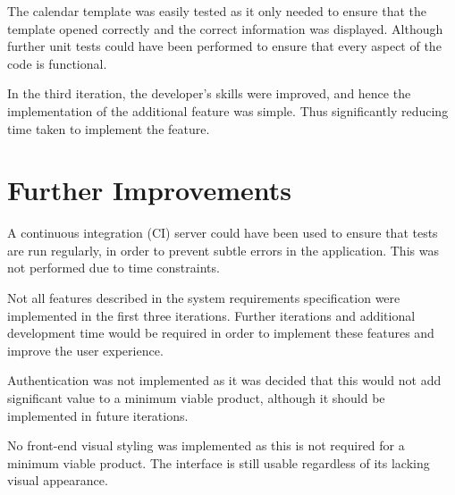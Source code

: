 \documentclass[11pt, a4paper]{article}
\begin{document}
	The calendar template was easily tested as it only needed to ensure that the template opened correctly and the correct information was displayed. Although further unit tests could have been performed to ensure that every aspect of the code is functional.
	
	In the third iteration, the developer's skills were improved, and hence the implementation of the additional feature was simple. Thus significantly reducing time taken to implement the feature. 
	
	\section{Further Improvements}
	A continuous integration (CI) server could have been used to ensure that tests are run regularly, in order to prevent subtle errors in the application. This was not performed due to time constraints.
	
	Not all features described in the system requirements specification were implemented in the first three iterations. Further iterations and additional development time would be required in order to implement these features and improve the user experience.
	
	Authentication was not implemented as it was decided that this would not add significant value to a minimum viable product, although it should be implemented in future iterations.
	
	No front-end visual styling was implemented as this is not required for a minimum viable product. The interface is still usable regardless of its lacking visual appearance.
\end{document}
